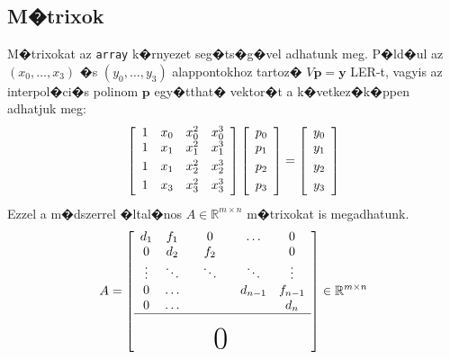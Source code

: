 \documentclass[oneside,11pt,a4paper]{article}
\newcommand{\IR}{\mathbb{R}}
\begin{document}
\subsection{M�trixok}
M�trixokat az \texttt{array} k�rnyezet seg�ts�g�vel adhatunk meg. P�ld�ul az $(x_0,\ldots,x_3)$ �s $(y_0,\ldots,y_3)$ alappontokhoz tartoz� $V\textbf{p}=\textbf{y}$ LER-t, vagyis az interpol�ci�s polinom $\textbf{p}$ egy�tthat� vektor�t a k�vetkez�k�ppen adhatjuk meg:
\begin{equation}
	\left[\begin{array}{cccc}
	   	  1 &  x_0  &  x_0^2  &  x_0^3\\ \vspace{1mm}
	   	  1 &  x_1  &  x_1^2  &  x_1^3\\ \vspace{1mm}
	   	  1 &  x_1  &  x_2^2  &  x_2^3\\ \vspace{1mm}
	   	  1 &  x_3  &  x_3^2  &  x_3^3
	\end{array}\right] 
	\left[\begin{array}{cccc}
	   	  p_0 \\ \vspace{1mm}
	   	  p_1 \\ \vspace{1mm}
	   	  p_2 \\ \vspace{1mm}
	   	  p_3   
	\end{array}\right] 
	=
	\left[\begin{array}{cccc}
	   	  y_0 \\ \vspace{1mm}
	   	  y_1 \\ \vspace{1mm}
	   	  y_2 \\ \vspace{1mm}
	   	  y_3   
	\end{array}\right]
\end{equation}
Ezzel a m�dszerrel �ltal�nos $A\in\IR^{m \times n}$ m�trixokat is megadhatunk.
\begin{equation}
	A = 
	\left[\begin{array}{ccccc}
	   	d_1 &   f_1  &     0  &  \ldots &  0     \\
	  	  0 &   d_2  &   f_2  & 				&  0     \\
   \vdots & \ddots & \ddots & \ddots  & \vdots \\
   			0 & \ldots & 				& d_{n-1} & f_{n-1}\\
   			0 & \ldots &        &					&			d_n\\
   			\hline\\
   			  &&\hspace{6mm}\mbox{\fontsize{24.88}{24.88}\selectfont 0}&& 
	\end{array}\right] \in \IR^{m \times n}
	\label{fig:bidiag}
\end{equation}
\end{document}
